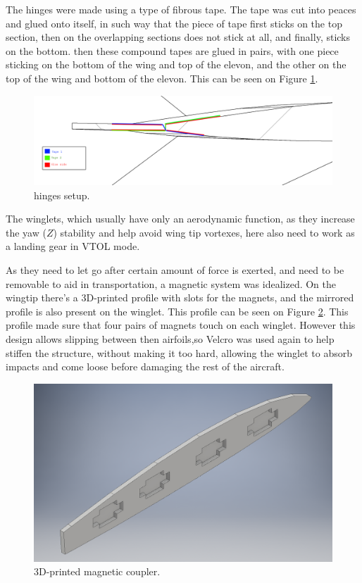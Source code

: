 The hinges were made using a type of fibrous tape. The tape was cut into peaces and glued onto itself, in such way that the piece of tape first sticks on the top section, then on the overlapping sections does not stick at all, and finally, sticks on the bottom.
then these compound tapes are glued in pairs, with one piece sticking on the bottom of the wing and top of the elevon, and the other on the top of the wing and bottom of the elevon. This can be seen on Figure \ref{fig:hinges}.


\begin{figure}[H]
\centering
  \includegraphics[width=\linewidth]{figs/elevons2.png}
  \caption{hinges setup.}
  \label{fig:hinges}
\end{figure}
	
	
	
The winglets, which usually have only an aerodynamic function, as they increase the yaw ($Z$) stability and help avoid wing tip vortexes, here also need to work as a landing gear in VTOL mode.

As they need to let go after certain amount of force is exerted, and need to be removable to aid in transportation, a magnetic system was idealized. On the wingtip there's a 3D-printed profile with slots for the magnets, and the mirrored profile is also present on the winglet. This profile can be seen on Figure \ref{fig:magnetcoupler}. This profile made sure that four pairs of magnets touch on each winglet. However this design allows slipping between then airfoils,so Velcro was used again to help stiffen the structure, without making it too hard, allowing the winglet to absorb impacts and come loose before damaging the rest of the aircraft.

	
\begin{figure}[H]
\centering
  \includegraphics[width=\linewidth]{figs/magnetcoupler.png}
  \caption{3D-printed magnetic coupler.}
  \label{fig:magnetcoupler}
\end{figure}
	

